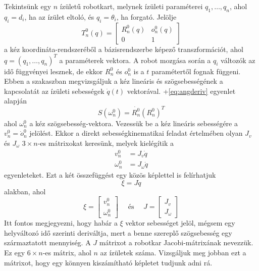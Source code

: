 \documentclass[12pt,a4paper]{report}
\theoremstyle{remark}
\theoremstyle{definition}
\begin{document}
Tekintsünk egy $n$ ízületű robotkart, melynek ízületi paraméterei $q_1, \ldots, q_n$, ahol $q_i = d_i$, ha az ízület 
eltoló, és $q_i = \theta_i$, ha forgató. Jelölje
\begin{equation}
T^{0}_{n}(q) = \begin{bmatrix}
    R^{0}_{n}(q) & o^{0}_{n}(q) \\ 
    0 & 1
    \end{bmatrix} 
\end{equation}
a kéz koordináta-rendszeréből a bázisrendszerbe képező transzformációt, ahol $q = (q_1, \ldots, q_n)^T$ a 
paraméterek vektora. A robot mozgása során a $q_i$ változók az idő függvényei lesznek, de ekkor $R^{0}_{n}$ és 
$o^{0}_{n}$ is a $t$ paramétertől fognak függeni. Ebben a szakaszban megvizsgáljuk a kéz lineáris és 
szögsebességének a kapcsolatát az ízületi sebességek $\dot{q}(t)$ vektorával. \Az+\eqref{eq:angderiv} egyenlet 
alapján
\begin{equation}
S(\omega^{0}_{n}) = \dot{R^{0}_{n}}(R^{0}_{n})^T
\end{equation}
ahol $\omega^{0}_{n}$ a kéz szögsebesség-vektora. Vezessük be a kéz lineáris sebességére a 
$v^{0}_{n} = \dot{o}^{0}_{n}$ jelölést. Ekkor a direkt sebességkinematikai feladat értelmében olyan $J_v$ és 
$J_\omega$ $3 \times n$-es mátrixokat keresünk, melyek kielégítik a
\begin{equation}
\begin{aligned}
v^{0}_{n} &= J_v \dot{q} \\
\omega^{0}_{n} &= J_\omega \dot{q}
\end{aligned}
\end{equation}
egyenleteket. Ezt a két összefüggést egy közös képlettel is 
felírhatjuk
\begin{equation} \label{eq:jacobidef}
\xi = J\dot{q}
\end{equation}
alakban, ahol 
\begin{equation} 
\xi = \begin{bmatrix}
    v^{0}_{n} \\ 
    \omega^{0}_{n}
\end{bmatrix}
\quad\textrm{ és }\quad 
J = \begin{bmatrix}
    J_v \\ 
    J_\omega
\end{bmatrix}
\end{equation}
Itt fontos megjegyezni, hogy habár a $\xi$ vektor sebességet jelöl, mégsem egy helyváltozó idő szerinti deriváltja, 
mert a benne szereplő szögsebesség egy származtatott mennyiség. A $J$ mátrixot a robotkar Jacobi-mátrixának 
nevezzük. Ez egy $6 \times n$-es mátrix, ahol $n$ az ízületek száma. Vizsgáljuk meg jobban ezt a mátrixot, hogy egy 
könnyen kiszámítható képletet tudjunk adni rá.
\end{document}

